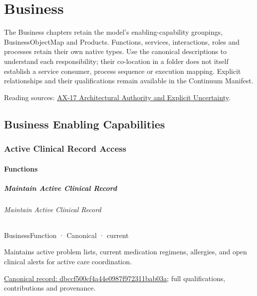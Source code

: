 \part{Business}
The Business chapters retain the model's enabling-capability groupings, BusinessObjectMap and Products. Functions, services, interactions, roles and processes retain their own native types. Use the canonical descriptions to understand each responsibility; their co-location in a folder does not itself establish a service consumer, process sequence or execution mapping. Explicit relationships and their qualifications remain available in the Continuum Manifest.

{\small Reading sources: \hyperref[element:8882573df7ce43c6bc0f66da0a676139]{AX-17 Architectural Authority and Explicit Uncertainty}.}\par
\chapter{Business Enabling Capabilities}

\section{Active Clinical Record Access}

\subsection{Functions}

\subsubsection{Maintain Active Clinical Record}

\paragraph{Maintain Active Clinical Record}

\label{element:dbccf500cf4a44e0987f972311bab03a}
{\small BusinessFunction · Canonical · current}\par

Maintains active problem lists, current medication regimens, allergies, and open clinical alerts for active care coordination.


{\footnotesize \href{../../../../continuum/business/business-function/dbccf500cf4a44e0987f972311bab03a.md}{Canonical record: dbccf500cf4a44e0987f972311bab03a}; full qualifications, contributions and provenance.}\par
